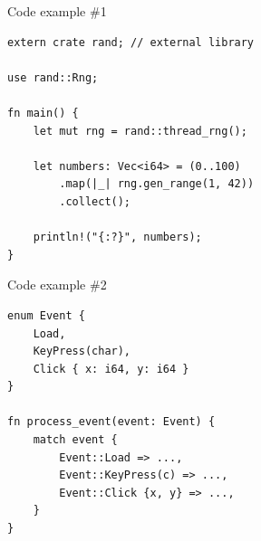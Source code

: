 \documentclass{beamer}
\begin{document}
    \begin{frame}[fragile]{Code example \#1}

        \large\begin{verbatim}
extern crate rand; // external library

use rand::Rng;

fn main() {
    let mut rng = rand::thread_rng();

    let numbers: Vec<i64> = (0..100)
        .map(|_| rng.gen_range(1, 42))
        .collect();

    println!("{:?}", numbers);
}
        \end{verbatim}

    \end{frame}

    \begin{frame}[fragile]{Code example \#2}
        \vfill
        \large\begin{verbatim}
enum Event {
    Load,
    KeyPress(char),
    Click { x: i64, y: i64 }
}

fn process_event(event: Event) {
    match event {
        Event::Load => ...,
        Event::KeyPress(c) => ...,
        Event::Click {x, y} => ...,
    }
}
        \end{verbatim}

    \end{frame}
\end{document}
